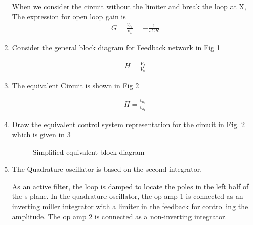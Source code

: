 \begin{enumerate}[label=\arabic*.,ref=\theenumi]
When we consider the circuit without the limiter and break the loop at X,
The expression for open loop gain is 
\begin{align}
    G = \frac{v_{o_1}}{v_x} = -\frac{1}{sCR}
    \label{eq:es17btech11009_G}
\end{align}

\item
Consider the general block diagram for Feedback network in Fig \ref{fig:es17btech11009_b3}
\renewcommand{\thefigure}{\theenumi.\arabic{figure}}
\begin{figure}[!ht]
	\begin{center}
		\resizebox{\columnwidth}{!}{}
	\end{center}
\caption{}
\label{fig:es17btech11009_b3}
\end{figure}
\begin{align}
    H = \frac{V_{f}}{V_{o}}
\end{align}
\item 
The equivalent Circuit is shown in Fig \ref{fig:es17btech11009_b4}
\renewcommand{\thefigure}{\theenumi.\arabic{figure}}
\begin{figure}[!ht]
	\begin{center}
		\resizebox{\columnwidth}{!}{}
	\end{center}
\caption{}
\label{fig:es17btech11009_b4}
\end{figure}
\begin{align}
    H = \frac{v_{o_2}}{v_{o_1}}
\end{align}
\item
Draw the equivalent control system representation for the circuit in Fig. \ref{fig:es17btech11009_b4} which is given in \ref{fig:es17btech11009_block}

\renewcommand{\thefigure}{\theenumi.\arabic{figure}}
\begin{figure}[!ht]
	\begin{center}
		\resizebox{\columnwidth}{!}{}
	\end{center}
\caption{Simplified equivalent block diagram}
\label{fig:es17btech11009_block}
\end{figure}
\item 
 The Quadrature oscillator is based on the second integrator.

As an active filter, the loop is damped to locate the poles in the left half of the s-plane. In the quadrature oscillator, the op amp 1 is connected as an inverting miller integrator with a limiter in the feedback for controlling the amplitude. The op amp 2 is connected as a non-inverting integrator.


\end{enumerate}
